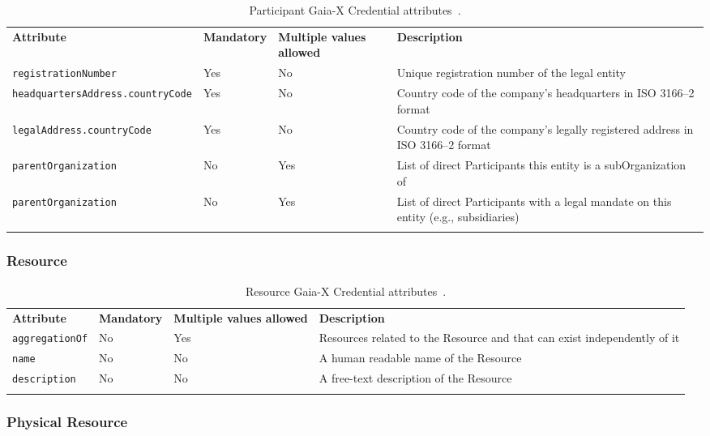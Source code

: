 \begin{longtable}{ |p{4cm}|p{2cm}|p{2cm}|p{7cm}| }
    \hhline{----}
    \textbf{Attribute} & \textbf{Mandatory} & \textbf{Multiple values allowed} & \textbf{Description}\\
    \hhline{----}
    \texttt{registrationNumber} & Yes & No & Unique registration number of the legal entity\\
    \hhline{----}
    \texttt{headquartersAddress.countryCode} & Yes & No & Country code of the company's headquarters in ISO 3166--2 format\\
    \hhline{----}
    \texttt{legalAddress.countryCode} & Yes & No & Country code of the company's legally registered address in ISO 3166--2 format\\
    \hhline{----}
    \texttt{parentOrganization} & No & Yes & List of direct Participants this entity is a subOrganization of\\
    \hhline{----}
    \texttt{parentOrganization} & No & Yes & List of direct Participants with a legal mandate on this entity (e.g., subsidiaries)\\
    \hhline{----}
    \caption{Participant Gaia-X Credential attributes~\cite{gaiax_trust_framework}.}
    \label{tab:participant}
\end{longtable}

\subsubsection{Resource}

\begin{longtable}{ |p{4cm}|p{2cm}|p{2cm}|p{7cm}| }
    \hhline{----}
    \textbf{Attribute} & \textbf{Mandatory} & \textbf{Multiple values allowed} & \textbf{Description}\\
    \hhline{----}
    \texttt{aggregationOf} & No & Yes & Resources related to the Resource and that can exist independently of it\\
    \hhline{----}
    \texttt{name} & No & No & A human readable name of the Resource\\
    \hhline{----}
    \texttt{description} & No & No & A free-text description of the Resource\\
    \hhline{----}
    \caption{Resource Gaia-X Credential attributes~\cite{gaiax_trust_framework}.}
    \label{tab:resource}
\end{longtable}

\pagebreak

\subsubsection{Physical Resource}

